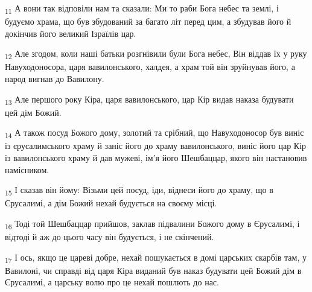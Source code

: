 \begin{tcolorbox}
\textsubscript{11} А вони так відповіли нам та сказали: Ми то раби Бога небес та землі, і будуємо храма, що був збудований за багато літ перед цим, а збудував його й докінчив його великий Ізраїлів цар.
\end{tcolorbox}
\begin{tcolorbox}
\textsubscript{12} Але згодом, коли наші батьки розгнівили були Бога небес, Він віддав їх у руку Навуходоносора, царя вавилонського, халдея, а храм той він зруйнував його, а народ вигнав до Вавилону.
\end{tcolorbox}
\begin{tcolorbox}
\textsubscript{13} Але першого року Кіра, царя вавилонського, цар Кір видав наказа будувати цей дім Божий.
\end{tcolorbox}
\begin{tcolorbox}
\textsubscript{14} А також посуд Божого дому, золотий та срібний, що Навуходоносор був виніс із єрусалимського храму й заніс його до храму вавилонського, виніс його цар Кір із вавилонського храму й дав мужеві, ім'я його Шешбаццар, якого він настановив намісником.
\end{tcolorbox}
\begin{tcolorbox}
\textsubscript{15} І сказав він йому: Візьми цей посуд, іди, віднеси його до храму, що в Єрусалимі, а дім Божий нехай будується на своєму місці.
\end{tcolorbox}
\begin{tcolorbox}
\textsubscript{16} Тоді той Шешбаццар прийшов, заклав підвалини Божого дому в Єрусалимі, і відтоді й аж до цього часу він будується, і не скінчений.
\end{tcolorbox}
\begin{tcolorbox}
\textsubscript{17} І ось, якщо це цареві добре, нехай пошукається в домі царських скарбів там, у Вавилоні, чи справді від царя Кіра виданий був наказ будувати цей Божий дім в Єрусалимі, а царську волю про це нехай пошлють до нас.
\end{tcolorbox}
